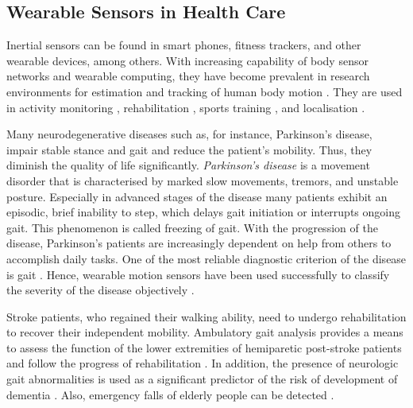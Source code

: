 \subsection{Wearable Sensors in Health Care}\label{sec:MARG_sensors_medical}

Inertial sensors can be found in smart phones, fitness trackers, and other wearable devices, among others. With increasing capability of body sensor networks and wearable computing, they have become prevalent in research environments for estimation and tracking of human body motion \cite{bennett_motion_2014}. They are used in activity monitoring \cite{veltink_detection_96, najafi_ambulatory_03, ermes_sports_08}, rehabilitation \cite{giggins_rehabilitation_13, lupinski_ligament_11}, sports training \cite{bonnet_squat_13, ermes_sports_08}, and localisation \cite{hoflinger_localization_13, Bennett_distance_13}.

Many neurodegenerative diseases such as, for instance, Parkinson's disease, impair stable stance and gait and reduce the patient's mobility. Thus, they diminish the quality of life significantly. \emph{Parkinson's disease} is a movement disorder that is characterised by marked slow movements, tremors, and unstable posture. Especially in advanced stages of the disease many patients exhibit an episodic, brief inability to step, which delays gait initiation or interrupts ongoing gait. This phenomenon is called freezing of gait. With the progression of the disease, Parkinson's patients are increasingly dependent on help from others to accomplish daily tasks. One of the most reliable diagnostic criterion of the disease is gait \cite{tao_gait_2012}. Hence, wearable motion sensors have been used successfully to classify the severity of the disease objectively \cite{mancini_anticipatory_2009, palmerini_feature_2011, klerk_long-term_2009}.

Stroke patients, who regained their walking ability, need to undergo rehabilitation to recover their independent mobility. Ambulatory gait analysis provides a means to assess the function of the lower extremities of hemiparetic post-stroke patients and follow the progress of rehabilitation \cite{tao_gait_2012, saremi_reliability_2006}. In addition, the presence of neurologic gait abnormalities is used as a significant predictor of the risk of development of dementia \cite{verghese_dementia_2002}. Also, emergency falls of elderly people can be detected \cite{bourke_threshold-based_2008, bourke_assessment-waist_2010, bourke_fall_detection_2008}.

